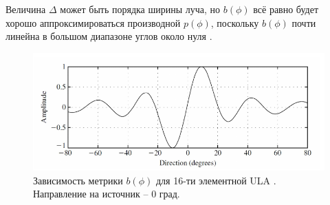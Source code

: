 Величина $\Delta$ может быть порядка ширины луча, но  $b(\phi)$ всё равно будет
хорошо аппроксимироваться производной $p(\phi)$, поскольку $b(\phi)$ почти
линейна в большом диапазоне углов около нуля \cite{Tuncer2009}.  

\begin{figure}[ht]
    \centering
    \includegraphics[width=\linewidth]{figs/fig3.11}
    \caption{Зависимость метрики $b(\phi)$ для 16-ти элементной ULA \cite{Tuncer2009}. Направление на источник -- 0 град.}
    \label{fig:3.11}
\end{figure}

